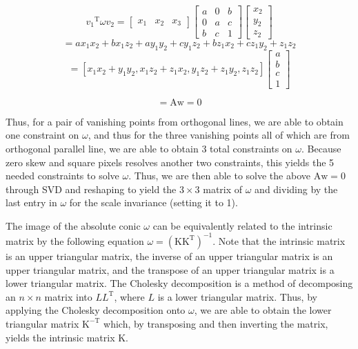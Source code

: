\documentclass[conference]{IEEEtran}
\begin{document}
\[ {v_1}^\mathrm{T}\omega{v_2} = \begin{bmatrix}
x_1 & x_2 & x_3 
\end{bmatrix}\begin{bmatrix}
a & 0 & b  \\
0 & a & c  \\
b & c & 1 
\end{bmatrix}\begin{bmatrix}
x_2\\
y_2 \\
z_2
\end{bmatrix}\]
\[ = ax_1x_2 + bx_1z_2 + ay_1y_2 + cy_1z_2 + bz_1x_2 + cz_1y_2 + z_1z_2\]
\[ = [x_1x_2 + y_1y_2 , x_1z_2 + z_1x_2 , y_1z_2 + z_1y_2 , z_1z_2]\begin{bmatrix}
a\\
b \\
c \\
1
\end{bmatrix} \]

\[ = \mathrm{A}\mathrm{w} = 0 \]

Thus, for a pair of vanishing points from orthogonal lines, we are able to obtain one constraint on \( \omega \), and thus for the three vanishing points all of which are from orthogonal parallel line, we are able to obtain 3 total constraints on \( \omega \). Because zero skew and square pixels resolves another two constraints, this yields the 5 needed constraints to solve \( \omega \). Thus, we are then able to solve the above \( \mathrm{A}\mathrm{w} = 0 \) through SVD and reshaping to yield the \( 3 \times 3 \) matrix of \( \omega \) and dividing by the last entry in \( \omega \) for the scale invariance (setting it to 1).

The image of the absolute conic \( \omega \) can be equivalently related to the intrinsic matrix by the following equation \( \omega = (\mathrm{K}\mathrm{K}^\mathrm{T})^{-1} \). Note that the intrinsic matrix is an upper triangular matrix, the inverse of an upper triangular matrix is an upper triangular matrix, and the transpose of an upper triangular matrix is a lower triangular matrix. The Cholesky decomposition is a method of decomposing an 
\(n \times n \) matrix into \( LL^\mathrm{T} \), where \( L \) is a lower triangular matrix. Thus, by applying the Cholesky decomposition onto \( \omega \), we are able to obtain the lower triangular matrix \( \mathrm{K}^\mathrm{-T}\) which, by transposing and then inverting the matrix, yields the intrinsic matrix \( \mathrm{K}\).

\clearpage
\end{document}
